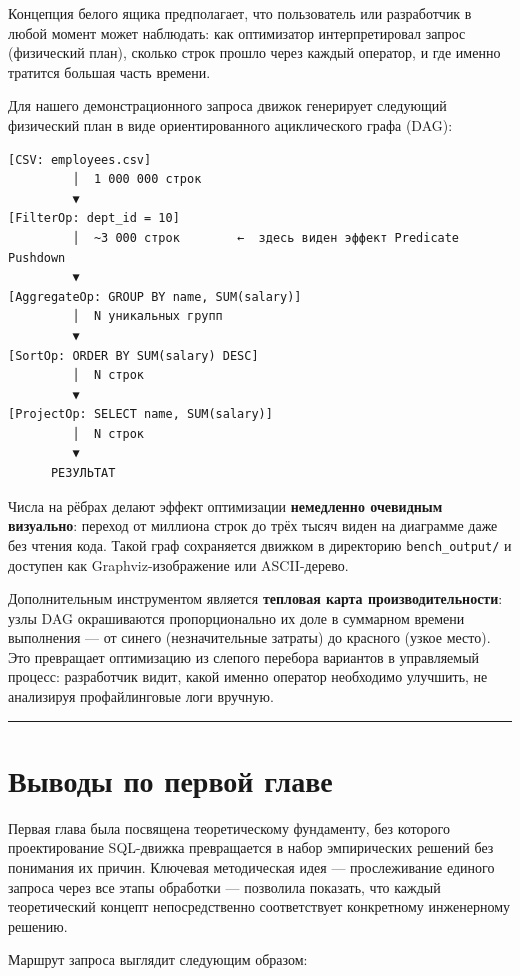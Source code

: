 \documentclass[a4paper,12pt]{report}
\begin{document}
{Концепция белого ящика предполагает, что пользователь или разработчик в любой момент может наблюдать: как оптимизатор интерпретировал запрос (физический план), сколько строк прошло через каждый оператор, и где именно тратится большая часть времени.

Для нашего демонстрационного запроса движок генерирует следующий физический план в виде ориентированного ациклического графа (DAG):

\begin{verbatim}
[CSV: employees.csv]
         │  1 000 000 строк
         ▼
[FilterOp: dept_id = 10]
         │  ~3 000 строк        ←  здесь виден эффект Predicate Pushdown
         ▼
[AggregateOp: GROUP BY name, SUM(salary)]
         │  N уникальных групп
         ▼
[SortOp: ORDER BY SUM(salary) DESC]
         │  N строк
         ▼
[ProjectOp: SELECT name, SUM(salary)]
         │  N строк
         ▼
      РЕЗУЛЬТАТ
\end{verbatim}

Числа на рёбрах делают эффект оптимизации \textbf{немедленно очевидным визуально}: переход от миллиона строк до трёх тысяч виден на диаграмме даже без чтения кода. Такой граф сохраняется движком в директорию \texttt{bench\_output/} и доступен как Graphviz-изображение или ASCII-дерево.

Дополнительным инструментом является \textbf{тепловая карта производительности}: узлы DAG окрашиваются пропорционально их доле в суммарном времени выполнения — от синего (незначительные затраты) до красного (узкое место). Это превращает оптимизацию из слепого перебора вариантов в управляемый процесс: разработчик видит, какой именно оператор необходимо улучшить, не анализируя профайлинговые логи вручную.

\vspace{0.5cm}\hrule\vspace{0.5cm}

\section{Выводы по первой главе}

Первая глава была посвящена теоретическому фундаменту, без которого проектирование SQL-движка превращается в набор эмпирических решений без понимания их причин. Ключевая методическая идея — прослеживание единого запроса через все этапы обработки — позволила показать, что каждый теоретический концепт непосредственно соответствует конкретному инженерному решению.

Маршрут запроса выглядит следующим образом:

}
\end{document}
